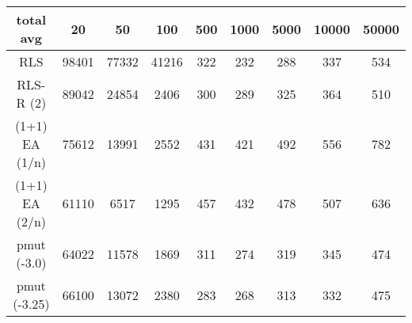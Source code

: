 \begin{tabular}[h]{ccccccccc}
total avg&20&50&100&500&1000&5000&10000&50000\\\hline
RLS&98401&77332&41216&322&232&288&337&534\\
RLS-R (2)&89042&24854&2406&300&289&325&364&510\\
(1+1) EA (1/n)&75612&13991&2552&431&421&492&556&782\\
(1+1) EA (2/n)&61110&6517&1295&457&432&478&507&636\\
pmut (-3.0)&64022&11578&1869&311&274&319&345&474\\
pmut (-3.25)&66100&13072&2380&283&268&313&332&475\\
\end{tabular}

